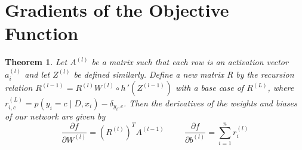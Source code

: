 \documentclass{article}
\begin{document}

    










\vspace{1cm}

\section{Gradients of the Objective Function}
\newtheorem{theorem}{Theorem}
\begin{theorem}
Let $A^{(l)}$ be a matrix such that each row is an activation vector $a_i^{(l)}$ and let $Z^{(l)}$ be defined similarly. Define a new matrix R by the recursion relation $R^{(l-1)} = R^{(l)}W^{(l)} \circ h\,'\left(Z^{(l-1)}\right)$ with a base case of $R^{(L)}$, where $r_{i, c}^{(L)} = p(y_i = c \mid D, x_i) - \delta_{y_i, c}$. Then the derivatives of the weights and biases of our network are given by \[\frac{\partial f}{\partial W^{(l)}} = \left(R^{(l)}\right)^TA^{(l-1)} \hspace{1cm} \frac{\partial f}{\partial b^{(l)}} = \sum_{i=1}^{n} r_i^{(l)} \]
\end{theorem}
\end{document}
